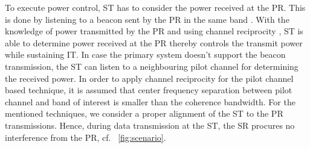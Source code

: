 \documentclass[conference, twocolumn]{IEEEtran}
\begin{document}
To execute power control, ST has to consider the power received at the PR. This is done by listening to a beacon sent by the PR in the same band \cite{Jing10}. With the knowledge of power transmitted by the PR and using channel reciprocity \cite{Tse05}, ST is able to determine power received at the PR thereby controls the transmit power while sustaining IT. In case the primary system doesn't support the beacon transmission, the ST can listen to a neighbouring pilot channel for determining the received power. In order to apply channel reciprocity for the pilot channel based technique, it is assumed that center frequency separation between pilot channel and band of interest is smaller than the coherence bandwidth. %
For the mentioned techniques, we consider a proper alignment of the ST to the PR transmissions. Hence, during data transmission at the ST, the SR procures no interference from the PR, cf. \figurename~\ref{fig:scenario}. 
\end{document}
